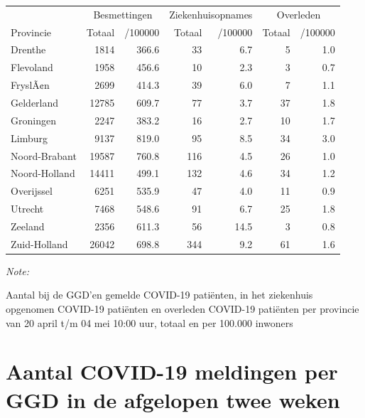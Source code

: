 \documentclass[
  english,
  man,floatsintext]{apa6}
\begin{document}
\begin{table}
\centering
\begin{threeparttable}
\begin{tabular}{lrrrrrr}
\toprule
\multicolumn{1}{c}{ } & \multicolumn{2}{c}{Besmettingen} & \multicolumn{2}{c}{Ziekenhuisopnames} & \multicolumn{2}{c}{Overleden} \\
\cmidrule(l{3pt}r{3pt}){2-3} \cmidrule(l{3pt}r{3pt}){4-5} \cmidrule(l{3pt}r{3pt}){6-7}
Provincie & Totaal & /100000 & Totaal & /100000 & Totaal & /100000\\
\midrule
Drenthe & 1814 & 366.6 & 33 & 6.7 & 5 & 1.0\\
Flevoland & 1958 & 456.6 & 10 & 2.3 & 3 & 0.7\\
FryslÃ¢n & 2699 & 414.3 & 39 & 6.0 & 7 & 1.1\\
Gelderland & 12785 & 609.7 & 77 & 3.7 & 37 & 1.8\\
Groningen & 2247 & 383.2 & 16 & 2.7 & 10 & 1.7\\
Limburg & 9137 & 819.0 & 95 & 8.5 & 34 & 3.0\\
Noord-Brabant & 19587 & 760.8 & 116 & 4.5 & 26 & 1.0\\
Noord-Holland & 14411 & 499.1 & 132 & 4.6 & 34 & 1.2\\
Overijssel & 6251 & 535.9 & 47 & 4.0 & 11 & 0.9\\
Utrecht & 7468 & 548.6 & 91 & 6.7 & 25 & 1.8\\
Zeeland & 2356 & 611.3 & 56 & 14.5 & 3 & 0.8\\
Zuid-Holland & 26042 & 698.8 & 344 & 9.2 & 61 & 1.6\\
\bottomrule
\end{tabular}
\begin{tablenotes}
\item \textit{Note: } 
\item Aantal bij de GGD’en gemelde COVID-19 patiënten, in het ziekenhuis opgenomen COVID-19 patiënten en overleden COVID-19 patiënten per provincie van 20 april t/m 04 mei 10:00 uur, totaal en per 100.000 inwoners
\end{tablenotes}
\end{threeparttable}
\end{table}

\newpage

\hypertarget{aantal-covid-19-meldingen-per-ggd-in-de-afgelopen-twee-weken}{%
\section{Aantal COVID-19 meldingen per GGD in de afgelopen twee weken}\label{aantal-covid-19-meldingen-per-ggd-in-de-afgelopen-twee-weken}}
\end{document}
